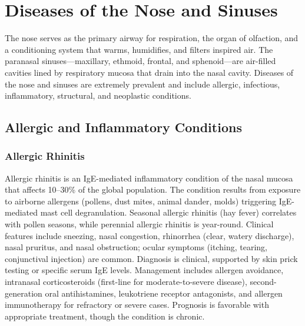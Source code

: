 \chapter{Diseases of the Nose and Sinuses}
\label{ch:nose}
The nose serves as the primary airway for respiration, the organ of olfaction, and a conditioning system that warms, humidifies, and filters inspired air. The paranasal sinuses---maxillary, ethmoid, frontal, and sphenoid---are air-filled cavities lined by respiratory mucosa that drain into the nasal cavity. Diseases of the nose and sinuses are extremely prevalent and include allergic, infectious, inflammatory, structural, and neoplastic conditions.

\section{Allergic and Inflammatory Conditions}








\label{sec:Allergic and Inflammatory Conditions}

\subsection{Allergic Rhinitis}
\label{sec:Allergic Rhinitis}
Allergic rhinitis is an IgE-mediated inflammatory condition of the nasal mucosa that affects 10--30\% of the global population. The condition results from exposure to airborne allergens (pollens, dust mites, animal dander, molds) triggering IgE-mediated mast cell degranulation. Seasonal allergic rhinitis (hay fever) correlates with pollen seasons, while perennial allergic rhinitis is year-round. Clinical features include sneezing, nasal congestion, rhinorrhea (clear, watery discharge), nasal pruritus, and nasal obstruction; ocular symptoms (itching, tearing, conjunctival injection) are common. Diagnosis is clinical, supported by skin prick testing or specific serum IgE levels. Management includes allergen avoidance, intranasal corticosteroids (first-line for moderate-to-severe disease), second-generation oral antihistamines, leukotriene receptor antagonists, and allergen immunotherapy for refractory or severe cases. Prognosis is favorable with appropriate treatment, though the condition is chronic.

